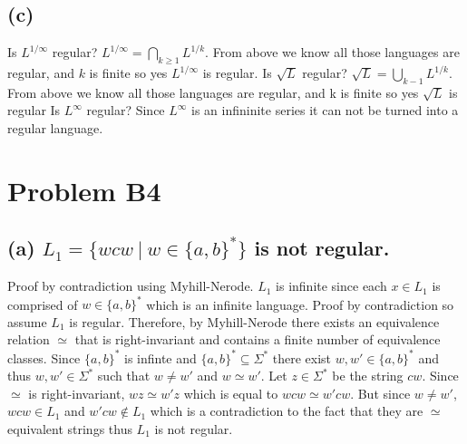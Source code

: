 \documentclass[12pt]{article}
\begin{document}
\subsection*{(c)}
Is $L^{1/\infty}$ regular? $L^{1/\infty} = \bigcap_{k\ge1}L^{1/k}$.
From above we know all those languages are regular, and $k$ is finite so
yes $L^{1/\infty}$ is regular.
\newline
Is $\sqrt{L}$ regular? $\sqrt{L} = \bigcup_{k-1}L^{1/k}$.
From above we know all those languages are regular,
and k is finite so yes $\sqrt{L}$ is regular
\newline
Is $L^{\infty}$ regular? Since $L^{\infty}$ is an infininite series it can not be turned into a regular language.
\section*{Problem B4}
\subsection*{(a) $L_1 = \{wcw\ |\ w \in \{a,b\}^*\}$
\textnormal {is} not \textnormal{regular.}}
Proof by contradiction using Myhill-Nerode. $L_1$ is infinite since
each $x \in L_1$ is comprised of $w \in \{a,b\}^*$ which is an infinite
language. Proof by contradiction so assume $L_1$ is regular. Therefore, by
Myhill-Nerode there exists an equivalence relation $\simeq$ that is
right-invariant and contains a finite number of equivalence classes. Since
$\{a,b\}^*$ is infinte and $\{a,b\}^* \subseteq \Sigma^*$ there exist
$w,w' \in \{a,b\}^*$ and thus $w,w'\in \Sigma^*$ such that
$w \neq w'$ and $w \simeq w'$. Let $z \in \Sigma^*$ be the string $cw$.
Since $\simeq$ is right-invariant, $wz \simeq w'z$ which is
equal to $wcw \simeq w'cw$. But since $w \neq w'$, $wcw \in L_1$
and $w'cw \notin L_1$ which is a contradiction to the fact that they are
$\simeq$ equivalent strings thus $L_1$ is not regular.
\end{document}
